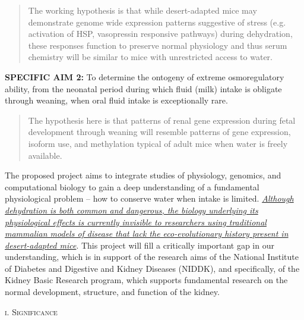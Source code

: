 \documentclass[11pt]{article}
\begin{document}
\begin{quote}
The working hypothesis is that while desert-adapted mice may demonstrate genome wide expression patterns suggestive of stress (e.g. activation of HSP, vasopressin responsive pathways) during dehydration, these responses function to preserve normal physiology and thus serum chemistry will be similar to mice with unrestricted access to water. 

\end{quote}

\noindent \textbf{SPECIFIC AIM 2:} To determine the ontogeny of extreme osmoregulatory ability, from the neonatal period during which fluid (milk) intake is obligate through weaning, when oral fluid intake is exceptionally rare. 

\begin{quote}
The hypothesis here is that patterns of renal gene expression during fetal development through weaning will resemble patterns of gene expression, isoform use, and methylation typical of adult mice when water is freely available. 

\end{quote}

The proposed project aims to integrate studies of physiology, genomics, and computational biology to gain a deep understanding of a fundamental physiological problem – how to conserve water when intake is limited. \ul{\emph{Although dehydration is both common and dangerous, the biology underlying its physiological effects is currently invisible to researchers using traditional mammalian models of disease that lack the eco-evolutionary history present in desert-adapted mice}}. This project will fill a critically important gap in our understanding, which is in support of the research aims of the National Institute of Diabetes and Digestive and Kidney Diseases (NIDDK), and specifically, of the Kidney Basic Research program, which supports fundamental research on the normal development, structure, and function of the kidney.

\newpage
\normalsize 
\begin{center}
\textsc{{i. Significance}} \\
\end{center}
\end{document}
